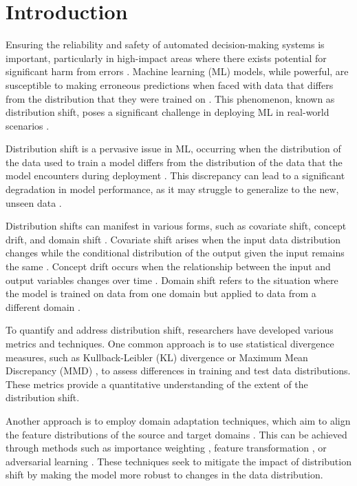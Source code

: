 
\section{Introduction}

Ensuring the reliability and safety of automated decision-making systems is important, particularly in high-impact areas where there exists potential for significant harm from errors \cite{amodei2016concrete}. Machine learning (ML) models, while powerful, are susceptible to making erroneous predictions when faced with data that differs from the distribution that they were trained on \cite{hendrycks2021many}. This phenomenon, known as distribution shift, poses a significant challenge in deploying ML in real-world scenarios \cite{quinonero2009dataset}.

Distribution shift is a pervasive issue in ML, occurring when the distribution of the data used to train a model differs from the distribution of the data that the model encounters during deployment \cite{quinonero2009dataset}. This discrepancy can lead to a significant degradation in model performance, as it may struggle to generalize to the new, unseen data \cite{hendrycks2019benchmarking}. 

Distribution shifts can manifest in various forms, such as covariate shift, concept drift, and domain shift \cite{moreno2012unifying}. Covariate shift arises when the input data distribution changes while the conditional distribution of the output given the input remains the same \cite{shimodaira2000improving}. Concept drift occurs when the relationship between the input and output variables changes over time \cite{gama2014survey}. Domain shift refers to the situation where the model is trained on data from one domain but applied to data from a different domain \cite{patel2015visual}.

To quantify and address distribution shift, researchers have developed various metrics and techniques. One common approach is to use statistical divergence measures, such as Kullback-Leibler (KL) divergence \cite{kullback1951information} or Maximum Mean Discrepancy (MMD) \cite{gretton2012kernel}, to assess differences in training and test data distributions. These metrics provide a quantitative understanding of the extent of the distribution shift.

Another approach is to employ domain adaptation techniques, which aim to align the feature distributions of the source and target domains \cite{wang2018deep}. This can be achieved through methods such as importance weighting \cite{sugiyama2007covariate}, feature transformation \cite{pan2009survey}, or adversarial learning \cite{ganin2016domain}. These techniques seek to mitigate the impact of distribution shift by making the model more robust to changes in the data distribution.

